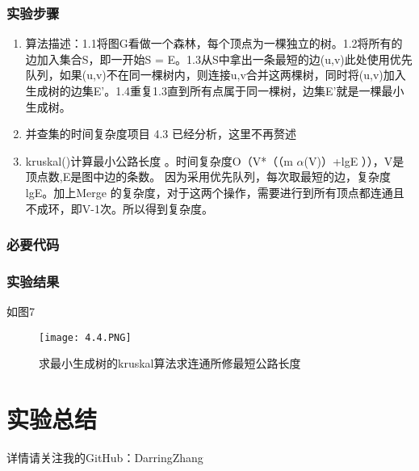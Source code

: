 \subsubsection{实验步骤}
\begin{enumerate}
\item 算法描述：1.1将图G看做一个森林，每个顶点为一棵独立的树。1.2将所有的边加入集合S，即一开始S = E。1.3从S中拿出一条最短的边(u,v)此处使用优先队列，如果(u,v)不在同一棵树内，则连接u,v合并这两棵树，同时将(u,v)加入生成树的边集E'。1.4重复1.3直到所有点属于同一棵树，边集E'就是一棵最小生成树。
\item 并查集的时间复杂度项目 4.3 已经分析，这里不再赘述
\item  kruskal()计算最小公路长度  。时间复杂度O（V*（（m $\alpha$(V)）+lgE ）），V是顶点数,E是图中边的条数。              因为采用优先队列，每次取最短的边，复杂度lgE。加上Merge 的复杂度，对于这两个操作，需要进行到所有顶点都连通且不成环，即V-1次。所以得到复杂度。
\end{enumerate}
\subsubsection{必要代码}


\subsubsection{实验结果}如图7
	\begin{figure}[!bthp]
	\centering
        \texttt{[image: 4.4.PNG]}
        \caption{求最小生成树的kruskal算法求连通所修最短公路长度}
      \end{figure}

\section{实验总结}详情请关注我的GitHub：DarringZhang



